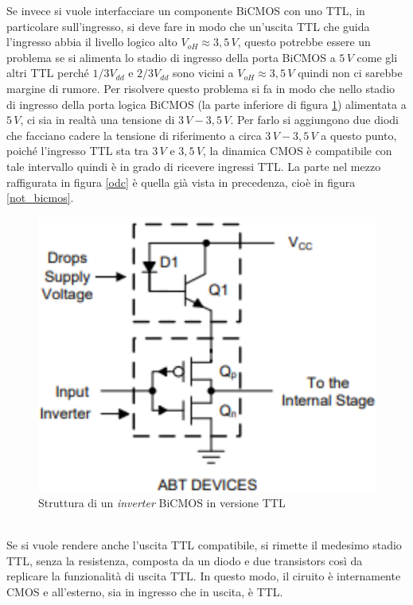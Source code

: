\documentclass[12pt, a4paper]{report}
\begin{document}
Se invece si vuole interfacciare un componente BiCMOS con uno TTL, in particolare sull'ingresso, si deve fare in modo che un'uscita TTL che guida l'ingresso abbia il livello logico alto $V_{oH} \approx 3,5\,V$, questo potrebbe essere un problema se si alimenta lo stadio di ingresso della porta BiCMOS a $5\,V$ come gli altri TTL perché $1/3V_{dd}$ e $2/3V_{dd}$ sono vicini a $V_{oH} \approx 3,5\,V$ quindi non ci sarebbe margine di rumore. Per risolvere questo problema si fa in modo che nello stadio di ingresso della porta logica BiCMOS (la parte inferiore di figura \ref{bicmos}) alimentata a $5\,V$, ci sia in realtà una tensione di $3\,V - 3,5\,V$. Per farlo si aggiungono due diodi che facciano cadere la tensione di riferimento a circa $3\,V - 3,5\,V$ a questo punto, poiché l'ingresso TTL sta tra $3\,V$ e $3,5\,V$, la dinamica CMOS è compatibile con tale intervallo quindi è in grado di ricevere ingressi TTL. La parte nel mezzo raffigurata in figura \ref{odc} è quella già vista in precedenza, cioè in figura \ref{not_bicmos}.
\begin{figure}[h]
    \centering
    \includegraphics[scale=0.4,angle=0]{bicmos2.png}
    \caption{Struttura di un \textit{inverter} BiCMOS in versione TTL}
    \label{bicmos}
\end{figure}
\\Se si vuole rendere anche l'uscita TTL compatibile, si rimette il medesimo stadio TTL, senza la resistenza, composta da un diodo e due transistors così da replicare la funzionalità di uscita TTL. In questo modo, il ciruito è internamente CMOS e all'esterno, sia in ingresso che in uscita, è TTL.
\end{document}
